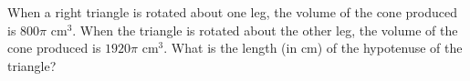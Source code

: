 When a right triangle is rotated about one leg, the volume of the cone produced is $800 \pi$ $\text{cm}^3$.  When the triangle is rotated about the other leg, the volume of the cone produced is $1920 \pi$ $\text{cm}^3$.  What is the length (in cm) of the hypotenuse of the triangle?